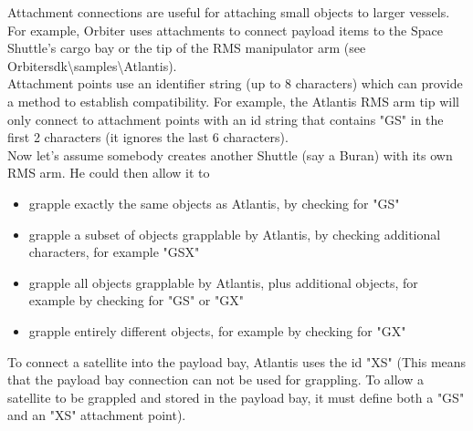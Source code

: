 \documentclass[Orbiter Developer Manual.tex]{subfiles}
\begin{document}
\noindent
Attachment connections are useful for attaching small objects to larger vessels. For example, Orbiter uses attachments to connect payload items to the Space Shuttle's cargo bay or the tip of the RMS manipulator arm (see Orbitersdk\textbackslash samples\textbackslash Atlantis).\\
Attachment points use an identifier string (up to 8 characters) which can provide a method to establish compatibility. For example, the Atlantis RMS arm tip will only connect to attachment points with an id string that contains "GS" in the first 2 characters (it ignores the last 6 characters).\\
Now let's assume somebody creates another Shuttle (say a Buran) with its own RMS arm. He could then allow it to
\begin{itemize}
\item grapple exactly the same objects as Atlantis, by checking for "GS"
\item grapple a subset of objects grapplable by Atlantis, by checking additional characters, for example "GSX"
\item grapple all objects grapplable by Atlantis, plus additional objects, for example by checking for "GS" or "GX"
\item grapple entirely different objects, for example by checking for "GX"
\end{itemize}

\noindent
To connect a satellite into the payload bay, Atlantis uses the id "XS" (This means that the payload bay connection can not be used for grappling. To allow a satellite to be grappled and stored in the payload bay, it must define both a "GS" and an "XS" attachment point).
\end{document}
